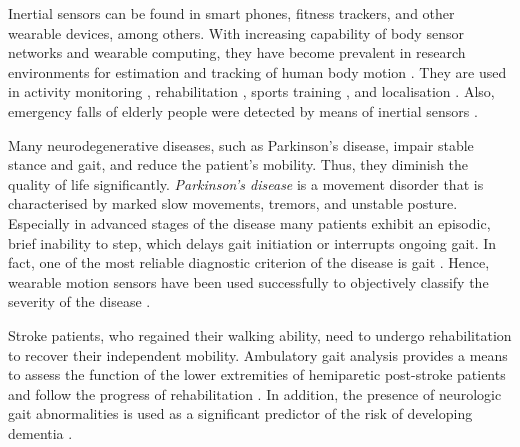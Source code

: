 Inertial sensors can be found in smart phones, fitness trackers, and other wearable devices, among others. With increasing capability of body sensor networks and wearable computing, they have become prevalent in research environments for estimation and tracking of human body motion \cite{bennett_motion_2014}. They are used in activity monitoring \cite{veltink_detection_96, najafi_ambulatory_03, ermes_sports_08}, rehabilitation \cite{giggins_rehabilitation_13, lupinski_ligament_11}, sports training \cite{bonnet_squat_13, ermes_sports_08}, and localisation \cite{hoflinger_localization_13, Bennett_distance_13}. Also, emergency falls of elderly people were detected by means of inertial sensors \cite{bourke_threshold-based_2008, bourke_assessment-waist_2010, bourke_fall_detection_2008}.

Many neurodegenerative diseases, such as Parkinson's disease, impair stable stance and gait, and reduce the patient's mobility. Thus, they diminish the quality of life significantly. \emph{Parkinson's disease} is a movement disorder that is characterised by marked slow movements, tremors, and unstable posture. Especially in advanced stages of the disease many patients exhibit an episodic, brief inability to step, which delays gait initiation or interrupts ongoing gait. In fact, one of the most reliable diagnostic criterion of the disease is gait \cite{tao_gait_2012}. Hence, wearable motion sensors have been used successfully to objectively classify the severity of the disease \cite{mancini_anticipatory_2009, palmerini_feature_2011, klerk_long-term_2009}.

Stroke patients, who regained their walking ability, need to undergo rehabilitation to recover their independent mobility. Ambulatory gait analysis provides a means to assess the function of the lower extremities of hemiparetic post-stroke patients and follow the progress of rehabilitation \cite{tao_gait_2012, saremi_reliability_2006}. In addition, the presence of neurologic gait abnormalities is used as a significant predictor of the risk of developing dementia \cite{verghese_dementia_2002}.

